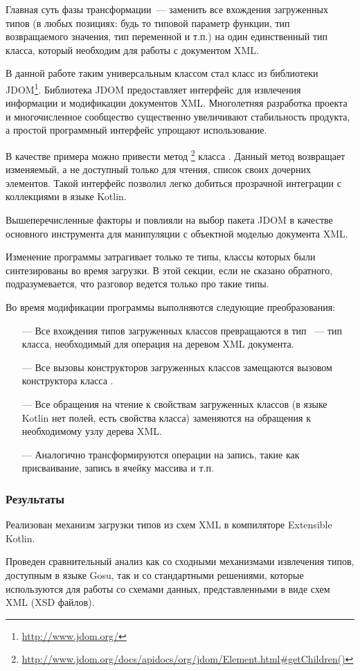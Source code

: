 Главная суть фазы трансформации~--- заменить все вхождения загруженных типов (в любых позициях: будь то типовой параметр функции, тип возвращаемого значения, тип переменной и т.п.) на один единственный тип класса, который необходим для работы с документом XML.

В данной работе таким универсальным классом стал класс  из библиотеки JDOM\footnote{\url{http://www.jdom.org/}}. Библиотека JDOM предоставляет интерфейс для извлечения информации и модификации документов XML. Многолетняя разработка проекта и многочисленное сообщество существенно увеличивают стабильность продукта, а простой программный интерфейс упрощают использование.

В качестве примера можно привести метод 
\footnote{\url{http://www.jdom.org/docs/apidocs/org/jdom/Element.html\#getChildren()}} класса .
Данный метод возвращает изменяемый, а не доступный только для чтения, список своих дочерних элементов. Такой интерфейс позволил легко добиться прозрачной интеграции с коллекциями в языке Kotlin.

Вышеперечисленные факторы и повлияли на выбор пакета JDOM в качестве основного инструмента для манипуляции с объектной моделью документа XML.

Изменение программы затрагивает только те типы, классы которых были синтезированы во время загрузки. В этой секции, если не сказано обратного, подразумевается, что разговор ведется только про такие типы.

Во время модификации программы выполняются следующие преобразования:
\begin{itemize}
\item[---] Все вхождения типов загруженных классов превращаются в тип ~--- тип класса, необходимый для операция на деревом XML документа.
\item[---] Все вызовы конструкторов загруженных классов замещаются вызовом конструктора класса .
\item[---] Все обращения на чтение к свойствам загруженных классов (в языке Kotlin нет полей, есть свойства класса) заменяются на обращения к необходимому узлу дерева XML.
\item[---] Аналогично трансформируются операции на запись, такие как присваивание, запись в ячейку массива и т.п.
\end{itemize}

\subsubsection{Результаты}
Реализован механизм загрузки типов из схем XML в компиляторе Extensible Kotlin.

Проведен сравнительный анализ как со сходными механизмами извлечения типов, доступным в языке Gosu, так и со стандартными решениями, которые используются для работы со схемами данных, представленными в виде схем XML (XSD файлов).